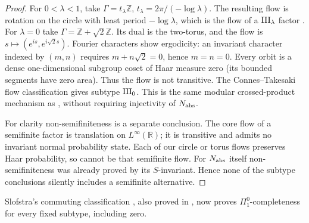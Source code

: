 \begin{proof}
For $0<\lambda<1$, take
$\Gamma=t_\lambda\mathbb Z$, $t_\lambda=2\pi/(-\log\lambda)$.
The resulting flow is rotation on the circle with least period
$-\log\lambda$, which is the flow of a $\mathrm{III}_\lambda$ factor \cite{ConnesTakesaki}.
For $\lambda=0$ take $\Gamma=\mathbb Z+\sqrt2\mathbb Z$.
Its dual is the two-torus, and the flow is
$s\mapsto(e^{is},e^{i\sqrt2s})$.
Fourier characters show ergodicity: an invariant character
indexed by $(m,n)$ requires $m+n\sqrt2=0$, hence $m=n=0$.
Every orbit is a dense one-dimensional subgroup coset of Haar
measure zero (its bounded segments have zero area).
Thus the flow is not transitive. The Connes--Takesaki flow
classification \cite{ConnesTakesaki} gives subtype $\mathrm{III}_0$.
This is the same modular crossed-product mechanism as
\cite[Example 3.9]{HM}, without requiring injectivity of $N_{\rm abs}$.

For clarity non-semifiniteness is a separate conclusion.
The core flow of a semifinite factor is translation on
$L^\infty(\mathbb R)$; it is transitive and admits no invariant
normal probability state. Each of our circle or torus flows
preserves Haar probability, so cannot be that semifinite flow.
For $N_{\rm abs}$ itself non-semifiniteness was already proved by its
$S$-invariant. Hence none of the subtype conclusions silently
includes a semifinite alternative.
\end{proof}
Slofstra's commuting classification \cite{Slofstra}, also proved in \cite[Theorem 6.4]{MNY}, now proves
$\Pi^0_1$-completeness for every fixed subtype, including zero.
